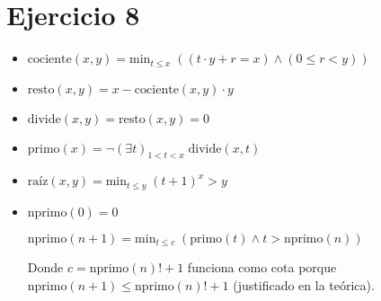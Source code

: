 \section*{Ejercicio 8}

\begin{itemize}
    \item $\text{cociente}(x, y) = \text{min}_{t \leq x} \; ((t \cdot y + r = x) \land (0 \leq r < y))$

    \item $\text{resto}(x, y) = x - \text{cociente}(x, y) \cdot y$

    \item $\text{divide}(x, y) = \text{resto}(x, y) = 0$

    \item $\text{primo}(x) = \neg (\exists t)_{1 < t < x}\; \text{divide}(x, t)$

    \item $\text{raíz}(x, y) = \text{min}_{t \leq y} \; (t + 1)^x > y$

    \item $\text{nprimo}(0) = 0$

    $\text{nprimo}(n + 1) = \text{min}_{t \leq c} \; (\text{primo}(t) \land t > \text{nprimo}(n))$

    Donde $c = \text{nprimo}(n)! + 1$ funciona como cota porque $\text{nprimo}(n + 1) \leq \text{nprimo}(n)! + 1$ (justificado en la teórica).
\end{itemize}

